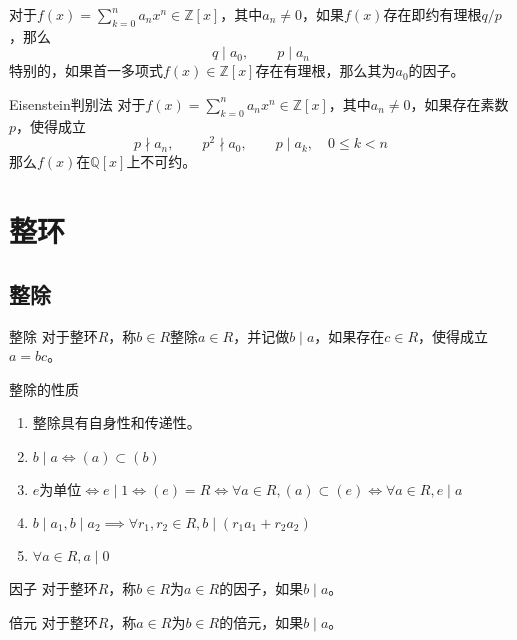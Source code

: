 \documentclass[lang = cn, scheme = chinese, thmcnt = section]{elegantbook}
\newcommand{\Q}{\mathbb{Q}}            %
\newcommand{\Z}{\mathbb{Z}}            %
\newcommand{\sub}{\subset}             %
\begin{document}
\begin{theorem}
	对于$\displaystyle f(x)=\sum_{k=0}^{n}a_n x^n\in\Z[x]$，其中$a_n\ne0$，如果$f(x)$存在即约有理根$q/p$，那么
	$$
	q\mid a_0,\qquad p\mid a_n
	$$
	特别的，如果首一多项式$f(x)\in\Z[x]$存在有理根，那么其为$a_0$的因子。
\end{theorem}

\begin{theorem}{Eisenstein判别法}
	对于$\displaystyle f(x)=\sum_{k=0}^{n}a_n x^n\in\Z[x]$，其中$a_n\ne0$，如果存在素数$p$，使得成立
	$$
	p\nmid a_n,\qquad p^2\nmid a_0,\qquad p\mid a_k,\quad 0\le k<n
	$$
	那么$f(x)$在$\Q[x]$上不可约。
\end{theorem}

\chapter{整环}

\section{整除}

\begin{definition}{整除}
	对于整环$R$，称$b\in R$整除$a\in R$，并记做$b\mid a$，如果存在$c\in R$，使得成立$a=bc$。
\end{definition}

\begin{proposition}{整除的性质}
	\begin{enumerate}
		\item 整除具有自身性和传递性。
		\item $b\mid a\iff (a)\sub (b)$
		\item $e\text{为单位}\iff e\mid1\iff (e)=R\iff \forall a\in R,(a)\sub (e)\iff \forall a\in R,e\mid a$
		\item $b\mid a_1,b\mid a_2\implies \forall r_1,r_2\in R,b\mid (r_1a_1+r_2a_2)$
		\item $\forall a\in R,a\mid 0$
	\end{enumerate}
\end{proposition}

\begin{definition}{因子}
	对于整环$R$，称$b\in R$为$a\in R$的因子，如果$b\mid a$。
\end{definition}

\begin{definition}{倍元}
	对于整环$R$，称$a\in R$为$b\in R$的倍元，如果$b\mid a$。
\end{definition}
\end{document}
